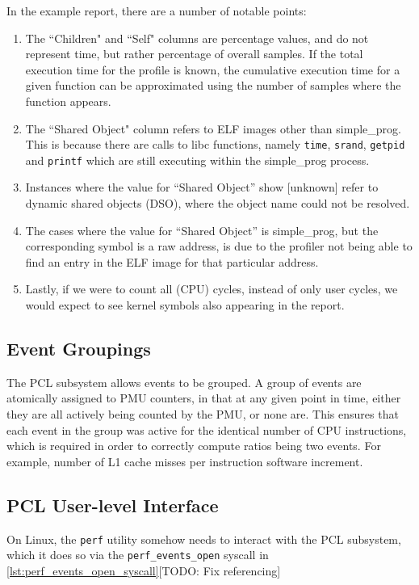 In the example report, there are a number of notable points:
\ssp
\begin{enumerate}
    \item The ``Children" and ``Self" columns are percentage values, and do not represent time, but rather percentage of overall samples. If the total execution time for the profile is known, the cumulative execution time for a given function can be approximated using the number of samples where the function appears. 
    \item The ``Shared Object" column refers to ELF images other than simple\_prog. This is because there are calls to libc functions, namely \texttt{time}, \texttt{srand}, \texttt{getpid} and \texttt{printf} which are still executing within the simple\_prog process.
    \item Instances where the value for ``Shared Object'' show [unknown] refer to dynamic shared objects (DSO), where the object name could not be resolved.
    \item The cases where the value for ``Shared Object'' is simple\_prog, but the corresponding symbol is a raw address, is due to the profiler not being able to find an entry in the ELF image for that particular address.
    \item Lastly, if we were to count all (CPU) cycles, instead of only user cycles, we would expect to see kernel symbols also appearing in the report.
\end{enumerate}
\dsp

\subsection{Event Groupings}\label{sect:event_groupings}

The PCL subsystem allows events to be grouped. A group of events are atomically assigned to PMU counters, in that at any given point in time, either they are all actively being counted by the PMU, or none are. This ensures that each event in the group was active for the identical number of CPU instructions, which is required in order to correctly compute ratios being two events. For example, number of L1 cache misses per instruction software increment.

\subsection{PCL User-level Interface}


On Linux, the \texttt{perf} utility somehow needs to interact with the PCL subsystem, which it does so via the \texttt{perf\_events\_open} syscall in \ref{lst:perf_events_open_syscall}[TODO: Fix referencing]

